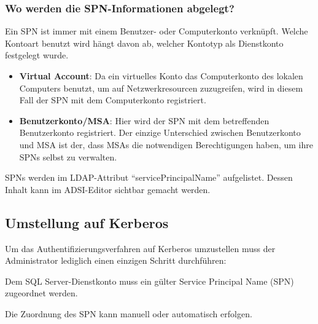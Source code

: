         \subsubsection{Wo werden die SPN-Informationen abgelegt?}
          Ein SPN ist immer mit einem Benutzer- oder Computerkonto verknüpft.
          Welche Kontoart benutzt wird hängt davon ab, welcher Kontotyp als
          Dienstkonto festgelegt wurde.
          \begin{itemize}
            \item \textbf{Virtual Account}: Da ein virtuelles Konto das
            Computerkonto des lokalen Computers benutzt, um auf
            Netzwerkresourcen zuzugreifen, wird in diesem Fall der SPN mit dem
            Computerkonto registriert.
            \item \textbf{Benutzerkonto/MSA}: Hier wird der SPN mit dem
            betreffenden Benutzerkonto registriert. Der einzige Unterschied
            zwischen Benutzerkonto und MSA ist der, dass MSAs die notwendigen
            Berechtigungen haben, um ihre SPNs selbst zu verwalten.
          \end{itemize}
          \begin{merke}
            SPNs werden im LDAP-Attribut \enquote{servicePrincipalName}
            aufgelistet. Dessen Inhalt kann im ADSI-Editor sichtbar gemacht
            werden.
          \end{merke}
          \begin{literaturinternet}
            \item \cite{ms191153}
            \item \cite{cc755804}
          \end{literaturinternet}
      \subsection{Umstellung auf Kerberos}
        Um das Authentifizierungsverfahren auf Kerberos umzustellen muss der
        Administrator lediglich einen einzigen Schritt durchführen:
      
        Dem SQL Server-Dienstkonto muss ein gülter Service Principal Name (SPN)
        zugeordnet werden.

        Die Zuordnung des SPN kann manuell oder automatisch erfolgen.
